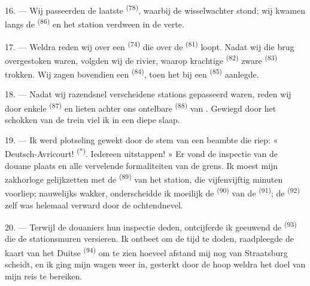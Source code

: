 16. --- Wij passeerden de laatste  \textsuperscript{(78)}, waarbij de
wisselwachter stond; wij kwamen langs de  \textsuperscript{(86)} en het
station verdween in de verte.

17. --- Weldra reden wij over een  \textsuperscript{(74)} die over de
 \textsuperscript{(81)} loopt. Nadat wij die brug overgestoken waren, volgden
wij de rivier, waarop krachtige
 \textsuperscript{(82)} zware 
\textsuperscript{(83)} trokken. Wij zagen bovendien een 
\textsuperscript{(84)}, toen het bij een  \textsuperscript{(85)} aanlegde.

18. --- Nadat wij razendsnel verscheidene stations gepasseerd waren, reden wij door enkele
 \textsuperscript{(87)} en lieten achter ons ontelbare 
\textsuperscript{(88)} van . Gewiegd door het schokken van de trein
viel ik in een diepe slaap.

\VUsaut{3.0mm}
\VUsaut{3.0mm}

19. --- Ik werd plotseling gewekt door de stem van een beambte die riep: « Deutsch-Avricourt!
\textsuperscript{(*)}. Iedereen uitstappen! » Er vond de inspectie van de douane plaats en
alle vervelende formaliteiten van de grens. Ik moest mijn zakhorloge gelijkzetten met de
 \textsuperscript{(89)} van het station, die vijfenvijftig minuten
voorliep; nauwelijks wakker, onderscheidde ik moeilijk de 
\textsuperscript{(90)} van de  \textsuperscript{(91)}; de
 \textsuperscript{(92)} zelf was helemaal verward door de
ochtendnevel.

20. --- Terwijl de douaniers hun inspectie deden, ontcijferde ik geeuwend de
 \textsuperscript{(93)} die de stationsmuren versieren.
Ik ontbeet om de tijd te doden, raadpleegde de kaart van het Duitse
 \textsuperscript{(94)} om te zien hoeveel afstand mij nog van
Straatsburg scheidt, en ik ging mijn wagen weer in, gesterkt door de hoop weldra het doel van
mijn reis te bereiken.
\VUsaut{6.0mm}
\VUfilet{22mm}
